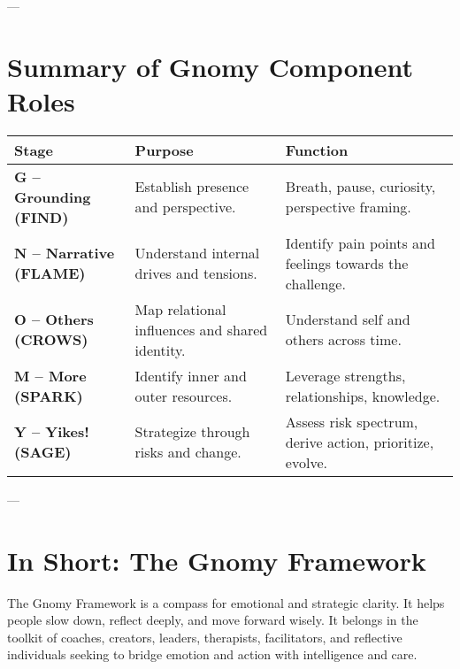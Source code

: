 \documentclass{article}
\begin{document}
---

\section{Summary of Gnomy Component Roles}
\begin{tabular}{|p{}|p{}|p{}|}
    \hline
    \textbf{Stage} & \textbf{Purpose} & \textbf{Function} \\
    \hline
    \textbf{G – Grounding (FIND)} & Establish presence and perspective. & Breath, pause, curiosity, perspective framing. \\
    \textbf{N – Narrative (FLAME)} & Understand internal drives and tensions. & Identify pain points and feelings towards the challenge. \\
    \textbf{O – Others (CROWS)} & Map relational influences and shared identity. & Understand self and others across time. \\
    \textbf{M – More (SPARK)} & Identify inner and outer resources. & Leverage strengths, relationships, knowledge. \\
    \textbf{Y – Yikes! (SAGE)} & Strategize through risks and change. & Assess risk spectrum, derive action, prioritize, evolve. \\
    \hline
\end{tabular}

---

\section{In Short: The Gnomy Framework}
The Gnomy Framework is a compass for emotional and strategic clarity. It helps people slow down, reflect deeply, and move forward wisely. It belongs in the toolkit of coaches, creators, leaders, therapists, facilitators, and reflective individuals seeking to bridge emotion and action with intelligence and care.
\end{document}
